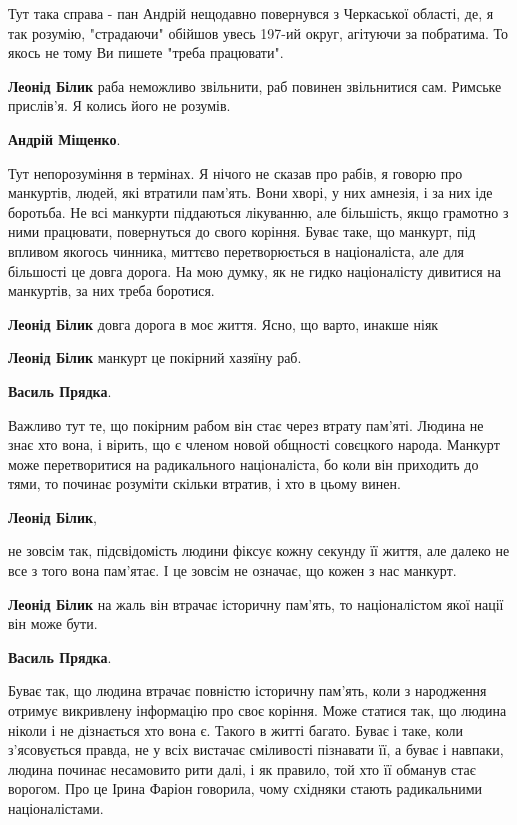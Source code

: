 \begin{itemize}
\begin{itemize}
Тут така справа - пан Андрій нещодавно повернувся з Черкаської області, де, я
так розумію, "страдаючи" обійшов увесь 197-ий округ, агітуючи за побратима. То
якось не тому Ви пишете "треба працювати".

\textbf{Леонід Білик} раба неможливо звільнити, раб повинен звільнитися сам. Римське прислів'я. Я колись його не розумів.

\textbf{Андрій Міщенко}. 

Тут непорозуміння в термінах. Я нічого не сказав про рабів, я говорю про
манкуртів, людей, які втратили пам'ять. Вони хворі, у них амнезія, і за них іде
боротьба. Не всі манкурти піддаються лікуванню, але більшість, якщо грамотно з
ними працювати, повернуться до свого коріння. Буває таке, що манкурт, під
впливом якогось чинника, миттєво перетворюється в націоналіста, але для
більшості це довга дорога. На мою думку, як не гидко націоналісту дивитися на
манкуртів, за них треба боротися.

\textbf{Леонід Білик} довга дорога в моє життя. Ясно, що варто, инакше ніяк

\textbf{Леонід Білик} манкурт це покірний хазяїну раб.

\textbf{Василь Прядка}. 

Важливо тут те, що покірним рабом він стає через втрату пам'яті. Людина не знає
хто вона, і вірить, що є членом новой общності совєцкого народа. Манкурт може
перетворитися на радикального націоналіста, бо коли він приходить до тями, то
починає розуміти скільки втратив, і хто в цьому винен.

\textbf{Леонід Білик}, 

не зовсім так, підсвідомість людини фіксує кожну секунду її життя, але далеко
не все з того вона пам'ятає. І це зовсім не означає, що кожен з нас манкурт.

\textbf{Леонід Білик} на жаль він втрачає історичну пам’ять, то націоналістом якої нації він може бути.

\textbf{Василь Прядка}. 

Буває так, що людина втрачає повністю історичну пам'ять, коли з народження
отримує викривлену інформацію про своє коріння. Може статися так, що людина
ніколи і не дізнається хто вона є. Такого в житті багато. Буває і таке, коли
з'ясовується правда, не у всіх вистачає сміливості пізнавати її, а буває і
навпаки, людина починає несамовито рити далі, і як правило, той хто її обманув
стає ворогом. Про це Ірина Фаріон говорила, чому східняки стають радикальними
націоналістами.


\end{itemize}
\end{itemize}
